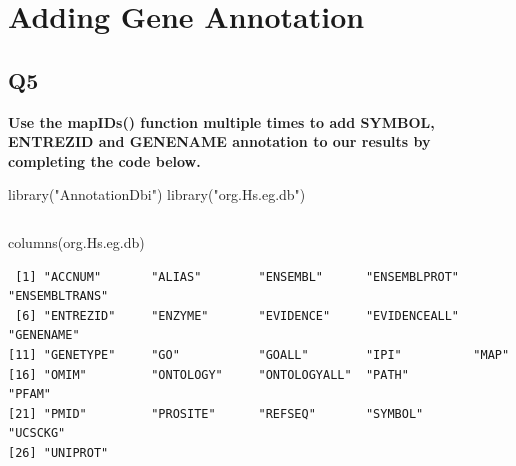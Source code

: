 \documentclass[
  letterpaper,
  DIV=11,
  numbers=noendperiod]{scrartcl}
\newenvironment{Shaded}{\begin{snugshade}}{\end{snugshade}}
\newcommand{\AttributeTok}[1]{\textcolor[rgb]{0.40,0.45,0.13}{#1}}
\newcommand{\FunctionTok}[1]{\textcolor[rgb]{0.28,0.35,0.67}{#1}}
\newcommand{\NormalTok}[1]{\textcolor[rgb]{0.00,0.23,0.31}{#1}}
\newcommand{\OtherTok}[1]{\textcolor[rgb]{0.00,0.23,0.31}{#1}}
\newcommand{\SpecialCharTok}[1]{\textcolor[rgb]{0.37,0.37,0.37}{#1}}
\newcommand{\StringTok}[1]{\textcolor[rgb]{0.13,0.47,0.30}{#1}}
\begin{document}
\hypertarget{adding-gene-annotation}{%
\section{Adding Gene Annotation}\label{adding-gene-annotation}}

\hypertarget{q5}{%
\subsection{\texorpdfstring{\textbf{Q5}}{Q5}}\label{q5}}

\textbf{Use the mapIDs() function multiple times to add SYMBOL, ENTREZID
and GENENAME annotation to our results by completing the code below.}

\begin{Shaded}
\begin{Highlighting}[]
\FunctionTok{library}\NormalTok{(}\StringTok{"AnnotationDbi"}\NormalTok{)}
\FunctionTok{library}\NormalTok{(}\StringTok{"org.Hs.eg.db"}\NormalTok{)}
\end{Highlighting}
\end{Shaded}

\begin{verbatim}
\end{verbatim}

\begin{Shaded}
\begin{Highlighting}[]
\FunctionTok{columns}\NormalTok{(org.Hs.eg.db)}
\end{Highlighting}
\end{Shaded}

\begin{verbatim}
 [1] "ACCNUM"       "ALIAS"        "ENSEMBL"      "ENSEMBLPROT"  "ENSEMBLTRANS"
 [6] "ENTREZID"     "ENZYME"       "EVIDENCE"     "EVIDENCEALL"  "GENENAME"    
[11] "GENETYPE"     "GO"           "GOALL"        "IPI"          "MAP"         
[16] "OMIM"         "ONTOLOGY"     "ONTOLOGYALL"  "PATH"         "PFAM"        
[21] "PMID"         "PROSITE"      "REFSEQ"       "SYMBOL"       "UCSCKG"      
[26] "UNIPROT"     
\end{verbatim}

\begin{Shaded}
\end{Shaded}
\end{document}
